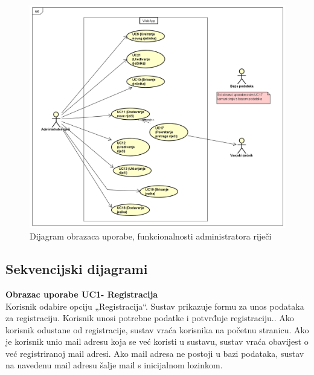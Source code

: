 					\begin{figure}[H]
						\includegraphics[width=\textwidth]{slike/UseCaseDiagram2.PNG}
						\caption{Dijagram obrazaca uporabe, funkcionalnosti administratora riječi}
						\label{fig:useCaseDiagram2}
					\end{figure} \newpage
				
			\subsection{Sekvencijski dijagrami}
				
%				
				
				\textbf{Obrazac uporabe UC1- Registracija}\\
				Korisnik odabire opciju „Registracija“. Sustav prikazuje formu za unos podataka za registraciju. Korisnik unosi potrebne podatke i potvrđuje registraciju.. Ako korisnik odustane od registracije, sustav vraća korisnika na početnu stranicu. Ako je korisnik unio mail adresu koja se već koristi u sustavu, sustav vraća obavijest o već registriranoj mail adresi. Ako mail adresa ne postoji u bazi podataka, sustav na navedenu mail adresu šalje mail s inicijalnom lozinkom.\newpage

